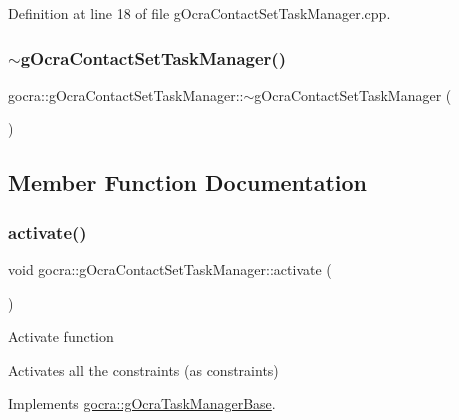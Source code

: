 Definition at line 18 of file g\+Ocra\+Contact\+Set\+Task\+Manager.\+cpp.

\hypertarget{classgocra_1_1gOcraContactSetTaskManager_a26033fec662f654121f63ea627a0f5d7}{}\label{classgocra_1_1gOcraContactSetTaskManager_a26033fec662f654121f63ea627a0f5d7} 
\subsubsection{\texorpdfstring{$\sim$g\+Ocra\+Contact\+Set\+Task\+Manager()}{~gOcraContactSetTaskManager()}}
{\footnotesize\ttfamily gocra\+::g\+Ocra\+Contact\+Set\+Task\+Manager\+::$\sim$g\+Ocra\+Contact\+Set\+Task\+Manager (\begin{DoxyParamCaption}{ }\end{DoxyParamCaption})}



\subsection{Member Function Documentation}
\hypertarget{classgocra_1_1gOcraContactSetTaskManager_a0fb5ccaae21c77073a6d0f310fe543a4}{}\label{classgocra_1_1gOcraContactSetTaskManager_a0fb5ccaae21c77073a6d0f310fe543a4} 
\subsubsection{\texorpdfstring{activate()}{activate()}}
{\footnotesize\ttfamily void gocra\+::g\+Ocra\+Contact\+Set\+Task\+Manager\+::activate (\begin{DoxyParamCaption}{ }\end{DoxyParamCaption})\hspace{0.3cm}{\ttfamily [virtual]}}

Activate function

Activates all the constraints (as constraints) 

Implements \hyperlink{classgocra_1_1gOcraTaskManagerBase_a50cf1c408749d6e9dcfaf50bcab77dee}{gocra\+::g\+Ocra\+Task\+Manager\+Base}.




